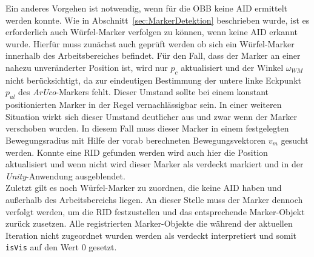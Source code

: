 Ein anderes Vorgehen ist notwendig, wenn für die OBB keine AID ermittelt werden konnte. Wie in Abschnitt~\ref{sec:MarkerDetektion} beschrieben wurde, ist es erforderlich auch Würfel-Marker verfolgen zu können, wenn keine AID erkannt wurde. Hierfür muss zunächst auch geprüft werden ob sich ein Würfel-Marker innerhalb des Arbeitsbereiches befindet. Für den Fall, dass der Marker an einer nahezu unveränderter Position ist, wird nur $p_c$  aktualisiert und der Winkel $\omega_{WM}$ nicht berücksichtigt, da zur eindeutigen Bestimmung der untere linke Eckpunkt $p_{ul}$ des \textit{ArUco}-Markers fehlt. Dieser Umstand sollte bei einem konstant positionierten Marker in der Regel vernachlässigbar sein. In einer weiteren Situation wirkt sich dieser Umstand deutlicher aus und zwar wenn der Marker verschoben wurden. In diesem Fall muss dieser Marker in einem festgelegten Bewegungsradius mit Hilfe der vorab berechneten Bewegungsvektoren $v_m$ gesucht werden. Konnte eine RID gefunden werden wird auch hier die Position aktualisiert und wenn nicht wird dieser Marker als verdeckt markiert und in der \textit{Unity}-Anwendung ausgeblendet.\\
Zuletzt gilt es noch Würfel-Marker zu zuordnen, die keine AID haben und außerhalb des Arbeitsbereichs liegen. An dieser Stelle muss der Marker dennoch verfolgt werden, um die RID festzustellen und das entsprechende Marker-Objekt zurück zusetzen. Alle registrierten Marker-Objekte die während der aktuellen Iteration nicht zugeordnet wurden werden als verdeckt interpretiert und somit \texttt{isVis} auf den Wert $0$ gesetzt.

